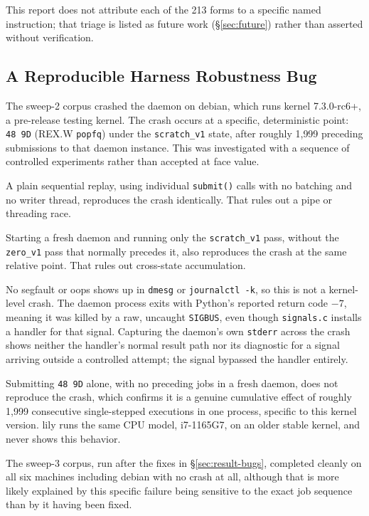 \documentclass[11pt]{article}
\newcommand{\code}[1]{\texttt{#1}}
\begin{document}
This report does not attribute each of the 213 forms to a specific
named instruction; that triage is listed as future work
(\S\ref{sec:future}) rather than asserted without verification.

\subsection{A Reproducible Harness Robustness Bug}
\label{sec:result-sigbus}

The sweep-2 corpus crashed the daemon on debian, which runs kernel
7.3.0-rc6+, a pre-release testing kernel. The crash occurs at a specific,
deterministic point: \code{48~9D} (REX.W \code{popfq}) under the
\code{scratch\_v1} state, after roughly 1{,}999 preceding submissions to
that daemon instance. This was investigated with a sequence of controlled
experiments rather than accepted at face value.

A plain sequential replay, using individual \code{submit()} calls with
no batching and no writer thread, reproduces the crash identically. That
rules out a pipe or threading race.

Starting a fresh daemon and running only the \code{scratch\_v1} pass,
without the \code{zero\_v1} pass that normally precedes it, also
reproduces the crash at the same relative point. That rules out
cross-state accumulation.

No segfault or oops shows up in \code{dmesg} or \code{journalctl~-k}, so
this is not a kernel-level crash. The daemon process exits with
Python's reported return code $-7$, meaning it was killed by a raw,
uncaught \code{SIGBUS}, even though \code{signals.c} installs a handler
for that signal. Capturing the daemon's own \code{stderr} across the
crash shows neither the handler's normal result path nor its diagnostic
for a signal arriving outside a controlled attempt; the signal bypassed
the handler entirely.

Submitting \code{48~9D} alone, with no preceding jobs in a fresh daemon,
does not reproduce the crash, which confirms it is a genuine cumulative
effect of roughly 1{,}999 consecutive single-stepped executions in one
process, specific to this kernel version. lily runs the same CPU model,
i7-1165G7, on an older stable kernel, and never shows this behavior.

The sweep-3 corpus, run after the fixes in \S\ref{sec:result-bugs},
completed cleanly on all six machines including debian with no crash at
all, although that is more likely explained by this specific failure
being sensitive to the exact job sequence than by it having been fixed.
\end{document}
